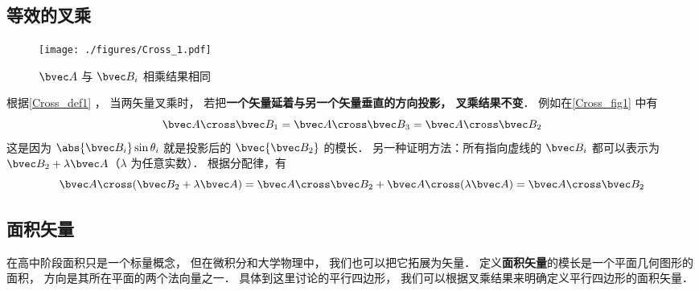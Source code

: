 
\subsection{等效的叉乘}\label{Cross_sub1}
\begin{figure}[ht]
\centering
\texttt{[image: ./figures/Cross\_1.pdf]}
\caption{$\bvec A$ 与 $\bvec B_i$ 相乘结果相同} \label{Cross_fig1}
\end{figure}

根据\autoref{Cross_def1} ， 当两矢量叉乘时， 若把\textbf{一个矢量延着与另一个矢量垂直的方向投影， 叉乘结果不变}． 例如在\autoref{Cross_fig1} 中有
\begin{equation}
\bvec A\cross\bvec B_1 = \bvec A \cross \bvec B_3 = \bvec A\cross \bvec B_2
\end{equation}
这是因为 $\abs{\bvec B_i}\sin\theta_i$ 就是投影后的 $\bvec{\bvec B_2}$ 的模长． 另一种证明方法：所有指向虚线的 $\bvec B_i$ 都可以表示为 $\bvec B_2 + \lambda \bvec A$（$\lambda$ 为任意实数）． 根据分配律，有
\begin{equation}
\bvec A \cross (\bvec B_2 + \lambda \bvec A) = \bvec A \cross \bvec B_2 + \bvec A \cross (\lambda \bvec A) = \bvec A \cross \bvec B_2
\end{equation}

\subsection{面积矢量}
在高中阶段面积只是一个标量概念， 但在微积分和大学物理中， 我们也可以把它拓展为矢量． 定义\textbf{面积矢量}的模长是一个平面几何图形的面积， 方向是其所在平面的两个法向量之一． 具体到这里讨论的平行四边形， 我们可以根据叉乘结果来明确定义平行四边形的面积矢量．

